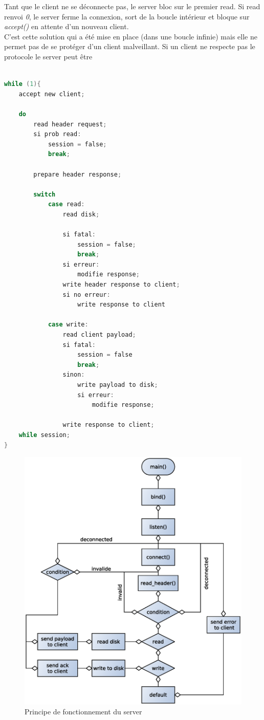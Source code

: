 \documentclass[a4paper,12pt]{article}
\begin{document}
Tant que le client ne se déconnecte pas, le server bloc sur le premier read. Si read renvoi \emph{0}, le server ferme la connexion, sort de la boucle intérieur et bloque sur \emph{accept()} en attente d'un nouveau client.\\

 C'est cette solution qui a été mise en place (dans une boucle infinie) mais elle ne permet pas de se protéger d'un client malveillant. Si un client ne respecte pas le protocole le server peut être 


\begin{lstlisting}[language=C, caption=pseudo code server]

while (1){
	accept new client;
	
	do 
		read header request;
		si prob read:
			session = false;
			break;
		
		prepare header response;
	
		switch
			case read:
				read disk;

				si fatal:
					session = false;
					break;			
				si erreur:
					modifie response;
				write header response to client;
				si no erreur:
					write response to client
		
			case write:
				read client payload;
				si fatal:
					session = false
					break;
				sinon:
					write payload to disk;
					si erreur:
						modifie response;
			
				write response to client;
	while session;
}			

\end{lstlisting}
\begin{figure}[H]
\begin{center}
\includegraphics[scale=.6]{imgs/schema_server}
\caption{Principe de fonctionnement du server}
\label{fig:Architecture server}
\end{center}
\end{figure}
\end{document}
